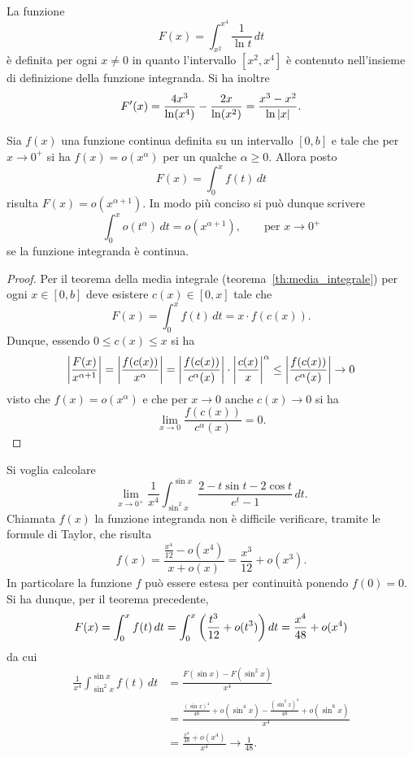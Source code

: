 \begin{example}
La funzione
\[
 F(x) = \int_{x^2}^{x^4} \frac{1}{\ln t}\, dt
\]
è definita per ogni $x\neq 0$ in quanto l'intervallo
$[x^2,x^4]$ è contenuto nell'insieme di definizione
della funzione integranda.
Si ha inoltre
\[
F'(x)
= \frac{4x^3}{\ln (x^4)} - \frac{2x}{\ln (x^2)}
= \frac{x^3-x^2}{\ln {\left|x\right|}}.
\]
\end{example}

\begin{theorem}
Sia $f(x)$ una funzione continua definita
su un intervallo $[0,b]$ e tale che
per $x\to 0^+$ si ha
$f(x) = o(x^\alpha)$ per un qualche $\alpha\ge 0$.
Allora posto
\[
  F(x) = \int_0^x f(t)\, dt
\]
risulta $F(x) = o(x^{\alpha+1})$.
In modo più conciso si può dunque scrivere
\[
  \int_0^x o(t^\alpha)\, dt = o (x^{\alpha+1}),
  \qquad \text{per $x\to 0^+$}
\]
se la funzione integranda è continua.
\end{theorem}
%
\begin{proof}
Per il teorema della media integrale (teorema~\ref{th:media_integrale})
per ogni $x\in [0,b]$ deve esistere $c(x)\in[0,x]$ tale che
\[
  F(x)
  = \int_0^x f(t)\, dt
  = x \cdot f(c(x)).
\]
Dunque, essendo $0\le c(x)\le x$ si ha
\[
{\left|\frac{F(x)}{x^{\alpha+1}}\right|}
= {\left|\frac{f(c(x))}{x^\alpha}\right|}
= {\left|\frac{f(c(x))}{c^\alpha(x)}\right|}
\cdot {\left|\frac{c(x)}{x}\right|}^\alpha
\le {\left|\frac{f(c(x))}{c^\alpha(x)}\right|} \to 0
\]
visto che $f(x) = o(x^\alpha)$
e che per $x\to 0$ anche $c(x)\to 0$
si ha
\[
  \lim_{x\to 0} \frac{f(c(x))}{c^\alpha(x)} = 0.
\]
\end{proof}

\begin{example}
Si voglia calcolare
\[
  \lim_{x\to 0^+} \frac{1}{x^4}\int_{\sin^2 x}^{\sin x} \frac{2- t\sin t - 2 \cos t}{e^t - 1}\, dt.
\]
Chiamata $f(x)$ la funzione integranda non è difficile
verificare, tramite le formule di Taylor, che risulta
\[
  f(x)
  = \frac{\frac{x^4}{12}-o(x^4)}{x+o(x)}
  = \frac{x^3}{12} + o(x^3).
\]
In particolare la funzione $f$ può essere estesa per
continuità ponendo $f(0)=0$.
Si ha dunque, per il teorema precedente,
\[
  F(x) = \int_0^x f(t)\, dt
  = \int_0^x {\left( \frac{t^3}{12}+o(t^3) \right)}\, dt
  = \frac{x^4}{48} + o(x^4)
\]
da cui
\begin{align*}
 \frac{1}{x^4} \int_{\sin^2 x}^{\sin x}
 f(t) \, dt
 &= \frac{F(\sin x) - F(\sin^2 x)}{x^4}\\
 &= \frac{\frac{(\sin x)^4}{48} + o(\sin^4 x) - \frac{(\sin^2 x)^4}{48} + o(\sin^8 x)}{x^4} \\
 &= \frac{\frac{x^4}{48} + o(x^4)}{x^4} \to \frac{1}{48}.
\end{align*}
\end{example}

